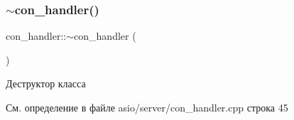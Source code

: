 \mbox{\label{group__con__handler__cpp_gaa1bc82c764eb633355a52bd77689ed3f}} 
\subsubsection{\texorpdfstring{$\sim$con\_handler()}{~con\_handler()}}
{\footnotesize\ttfamily con\+\_\+handler\+::$\sim$con\+\_\+handler (\begin{DoxyParamCaption}{ }\end{DoxyParamCaption})}



Деструктор класса 



См. определение в файле asio/server/con\+\_\+handler.\+cpp строка 45

